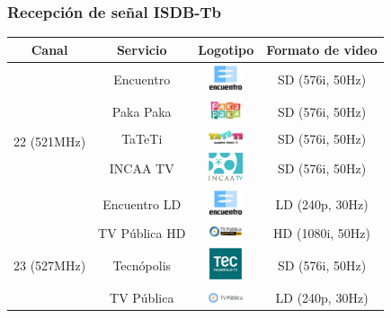 \documentclass[a4paper,11pt]{beamer}
\begin{document}
			\begin{frame}
				\frametitle{Recepción de señal ISDB-Tb}
				\begin{tabular}[t]{ | c | c | c | c | }
			\hline
			Canal 	& Servicio 		& Logotipo		&		Formato de video \\
			\hline\hline
			\multirow{5}{*}{22 (521MHz)}	& Encuentro 	& \includegraphics[width=1cm]{logoencuentro.png}	& SD (576i, 50Hz) \\\cline{2-4}
								& Paka Paka 	& \includegraphics[width=1cm]{logopakapaka.png}	& SD (576i, 50Hz) \\\cline{2-4}
								& TaTeTi 		& \includegraphics[width=1cm]{logotateti.png}	& SD (576i, 50Hz) \\\cline{2-4}
								& INCAA TV 		& \includegraphics[width=1cm]{logoincaa.png}	& SD (576i, 50Hz) \\\cline{2-4}
								& Encuentro LD 	& \includegraphics[width=1cm]{logoencuentro.png}	& LD (240p, 30Hz) \\\hline\hline
			\multirow{3}{*}{23 (527MHz)}	& TV Pública HD & \includegraphics[width=1cm]{logotvpublicahd.png}	& HD (1080i, 50Hz)\\\cline{2-4}
								& Tecnópolis	& \includegraphics[width=1cm]{logotecnopolis.png}	& SD (576i, 50Hz) \\\cline{2-4}
								& TV Pública 	& \includegraphics[width=1cm]{logotvpublica.png}	& LD (240p, 30Hz) \\\hline
			\end{tabular}
			\end{frame}
\end{document}
